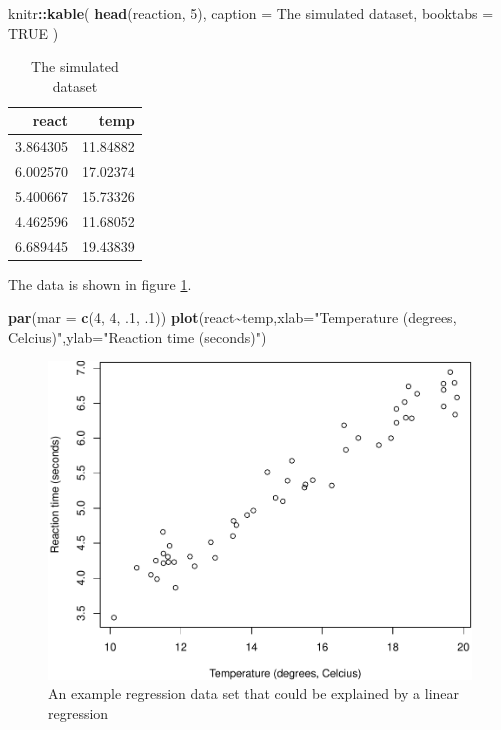 \documentclass[
]{book}
\newenvironment{Shaded}{\begin{snugshade}}{\end{snugshade}}
\newcommand{\AttributeTok}[1]{\textcolor[rgb]{0.13,0.29,0.53}{#1}}
\newcommand{\ConstantTok}[1]{\textcolor[rgb]{0.56,0.35,0.01}{#1}}
\newcommand{\DecValTok}[1]{\textcolor[rgb]{0.00,0.00,0.81}{#1}}
\newcommand{\FunctionTok}[1]{\textcolor[rgb]{0.13,0.29,0.53}{\textbf{#1}}}
\newcommand{\NormalTok}[1]{#1}
\newcommand{\SpecialCharTok}[1]{\textcolor[rgb]{0.81,0.36,0.00}{\textbf{#1}}}
\newcommand{\StringTok}[1]{\textcolor[rgb]{0.31,0.60,0.02}{#1}}
\begin{document}
\begin{Shaded}
\begin{Highlighting}[]
\NormalTok{knitr}\SpecialCharTok{::}\FunctionTok{kable}\NormalTok{(}
  \FunctionTok{head}\NormalTok{(reaction, }\DecValTok{5}\NormalTok{), }\AttributeTok{caption =} \StringTok{\textquotesingle{}The simulated dataset\textquotesingle{}}\NormalTok{,}
  \AttributeTok{booktabs =} \ConstantTok{TRUE}
\NormalTok{)}
\end{Highlighting}
\end{Shaded}

\begin{table}

\caption{\label{tab:Ttab1}The simulated dataset}
\centering
\begin{tabular}[t]{rr}
\toprule
react & temp\\
\midrule
3.864305 & 11.84882\\
6.002570 & 17.02374\\
5.400667 & 15.73326\\
4.462596 & 11.68052\\
6.689445 & 19.43839\\
\bottomrule
\end{tabular}
\end{table}

The data is shown in figure \ref{fig:Freg}.

\begin{Shaded}
\begin{Highlighting}[]
\FunctionTok{par}\NormalTok{(}\AttributeTok{mar =} \FunctionTok{c}\NormalTok{(}\DecValTok{4}\NormalTok{, }\DecValTok{4}\NormalTok{, .}\DecValTok{1}\NormalTok{, .}\DecValTok{1}\NormalTok{))}
\FunctionTok{plot}\NormalTok{(react}\SpecialCharTok{\textasciitilde{}}\NormalTok{temp,}\AttributeTok{xlab=}\StringTok{"Temperature (degrees, Celcius)"}\NormalTok{,}\AttributeTok{ylab=}\StringTok{"Reaction time (seconds)"}\NormalTok{)}
\end{Highlighting}
\end{Shaded}

\begin{figure}

{\centering \includegraphics[width=0.8\linewidth]{ECOMODbook_files/figure-latex/Freg-1} 

}

\caption{An example regression data set that could be explained by a linear regression}\label{fig:Freg}
\end{figure}
\end{document}
